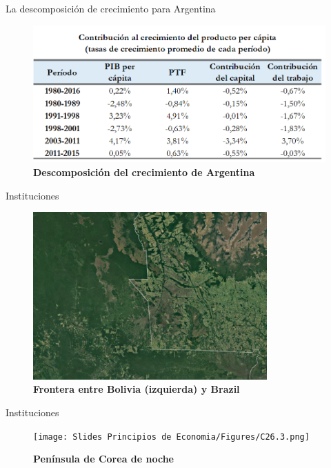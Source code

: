 \documentclass{beamer}
\begin{document}
\begin{frame}{La descomposición de crecimiento para Argentina}
    \begin{figure} [H]   \includegraphics[scale=0.55]{Slides Principios de Economia/Figures/C17.4.png}
\caption{\textbf{Descomposición del crecimiento de Argentina}}
\label{fig:26.4}
\end{figure}
\end{frame}


\begin{frame}{Instituciones}
    
\begin{figure}[H]
\begin{center}
\includegraphics[width=0.8\textwidth]{Slides Principios de Economia/Figures/C26.2.png}
\end{center}
\caption{\textbf{Frontera entre Bolivia (izquierda) y Brazil}}
\label{fig:border_bol_bra}
\end{figure}
\end{frame}

\begin{frame}{Instituciones}
    \begin{figure}[H]
\begin{center}
\texttt{[image: Slides Principios de Economia/Figures/C26.3.png]}
\end{center}
\caption{\textbf{Península de Corea de noche}}
\label{fig:korea}
\end{figure}
\end{frame}
\end{document}
